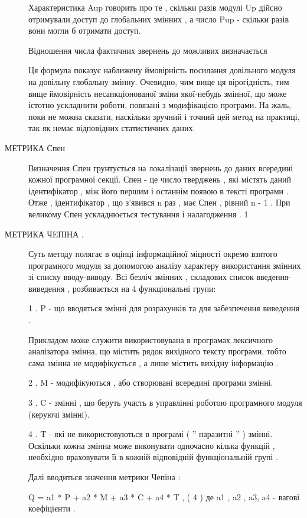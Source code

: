 \begin{description}
Характеристика Aup говорить про те , скільки разів модулі Up дійсно отримували доступ до глобальних змінних , а число Pup - скільки разів вони могли б отримати доступ.

Відношення числа фактичних звернень до можливих визначається



Ця формула показує наближену ймовірність посилання довільного модуля на довільну глобальну змінну. Очевидно, чим вище ця вірогідність, тим вище ймовірність несанкціонованої зміни якої-небудь змінної, що може істотно ускладнити роботи, пов\dq язані з модифікацією програми. На жаль, поки не можна сказати, наскільки зручний і точний цей метод на практиці, так як немає відповідних статистичних даних.

\item[{МЕТРИКА Спен}] \leavevmode
Визначення Спен грунтується на локалізації звернень до даних всередині кожної програмної секції. Спен - це число тверджень , які містять даний ідентифікатор , між його першим і останнім появою в тексті програми . Отже , ідентифікатор , що з'явився n раз , має Спен , рівний n - 1 . При великому Спен ускладнюється тестування і налагодження .
1

\item[{МЕТРИКА ЧEПІНА .}] \leavevmode
Суть методу полягає в оцінці інформаційної міцності окремо взятого програмного модуля за допомогою аналізу характеру використання змінних зі списку вводу-виводу.
Всі безліч змінних , складових список введення-виведення , розбивається на 4 функціональні групи:

1 . P - що вводяться змінні для розрахунків та для забезпечення виведення .

Прикладом може служити використовувана в програмах лексичного аналізатора змінна, що містить рядок вихідного тексту програми, тобто сама змінна не модифікується , а лише містить вихідну інформацію .

2 . M - модифікуються , або створювані всередині програми змінні.

3 . C - змінні , що беруть участь в управлінні роботою програмного модуля (керуючі змінні).

4 . T - які не використовуються в програмі ( '' паразитні '' ) змінні. Оскільки кожна змінна може виконувати одночасно кілька функцій , необхідно враховувати її в кожній відповідній функціональній групі .

Далі вводиться значення метрики Чепіна :

Q = a1 * P + a2 * M + a3 * C + a4 * T , ( 4 )
де a1 , a2 , a3, a4 - вагові коефіцієнти .


\end{description}
